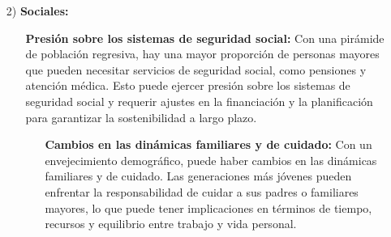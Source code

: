 \documentclass[8pt,a4paper]{beamer}
\begin{document}
{\begin{frame}{}
\begin{block}{}
\begin{enumerate}
\begin{enumerate}
\begin{itemize}
\item[\ding{65}] \textbf{Disminución de la población en edad laboral:} Con una base estrecha y una mayor proporción de personas mayores, las pirámides de población regresivas pueden indicar una disminución de la fuerza laboral potencial. Esto puede tener implicaciones económicas, ya que puede haber una menor disponibilidad de mano de obra joven para impulsar el crecimiento y la productividad económica.
\end{itemize}
\item[2)] \textbf{Sociales:} 
\begin{itemize}
\justifying
\item[\ding{65}] \textbf{Presión sobre los sistemas de seguridad social:} Con una pirámide de población regresiva, hay una mayor proporción de personas mayores que pueden necesitar servicios de seguridad social, como pensiones y atención médica. Esto puede ejercer presión sobre los sistemas de seguridad social y requerir ajustes en la financiación y la planificación para garantizar la sostenibilidad a largo plazo.
\end{itemize}
\end{enumerate}
\end{enumerate}
\end{block}
\end{frame}


\begin{frame}{}
\begin{block}{}
\justifying
\begin{enumerate}
\justifying
\item[{}] 
\begin{enumerate}
\justifying
\item[{}]
\begin{itemize}
\justifying
\item[\ding{65}] \textbf{Cambios en las dinámicas familiares y de cuidado:} Con un envejecimiento demográfico, puede haber cambios en las dinámicas familiares y de cuidado. Las generaciones más jóvenes pueden enfrentar la responsabilidad de cuidar a sus padres o familiares mayores, lo que puede tener implicaciones en términos de tiempo, recursos y equilibrio entre trabajo y vida personal.


\end{itemize}
\end{enumerate}
\end{enumerate}
\end{block}
\end{frame}}
\end{document}
